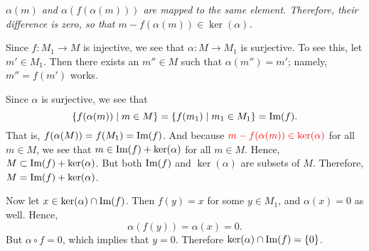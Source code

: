 \begin{prf}
\begin{description}
\begin{center}
            \textit{$\alpha(m)$ and $\alpha(f(\alpha(m)))$ are mapped to
            the same element. Therefore, their difference is zero,
            so that $m - f(\alpha(m)) \in \ker(\alpha)$. }

        \end{center}
        Since $f: M_1 \to M$ is injective, we see that $\alpha: M
        \to M_1$ is surjective. To see this, let $m' \in M_1$.
        Then there exists an $m'' \in M$ such that $\alpha(m'') = m'$;
        namely, $m'' = f(m')$ works. 

        Since $\alpha$ is surjective, we see that 
        \[
            \{f(\alpha(m)) \mid m \in M\} = \{f(m_1) \mid m_1 \in M_1 \} = \mbox{Im}(f).
        \]
        That is, $f(\alpha(M)) = f(M_1) = \mbox{Im}(f)$.
        And because $\textcolor{red}{m - f(\alpha(m)) \in \ker(\alpha)}$ for all $m
        \in M$, we see that $m \in \mbox{Im}(f) + \ker(\alpha)$ for
        all $m \in M$. Hence, $M \subset \mbox{Im}(f) + \ker(\alpha)$.
        But both $\mbox{Im}(f)$ and $\ker(\alpha)$ are subsets of $M$.
        Therefore, $M = \mbox{Im}(f) + \ker(\alpha)$.     

        Now let $x \in \ker(\alpha) \cap \mbox{Im}(f)$. Then $f(y) = x$
        for some $y \in M_1$, and $\alpha(x) = 0$ as well. Hence, 
        \[
            \alpha(f(y)) = \alpha(x) = 0.
        \]
        But $\alpha \circ f = 0$, which implies that $y = 0$.
        Therefore $\ker(\alpha) \cap \mbox{Im}(f) = \{0\}$. 
        \begin{center}
\end{center}
\end{description}
\end{prf}
